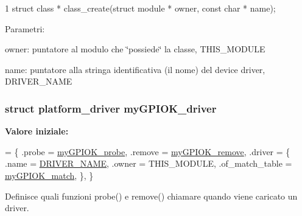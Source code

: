 \begin{DoxyCode}
1 struct class * class\_create(struct module * owner, const char * name);
\end{DoxyCode}
 Parametri\+:
\begin{DoxyItemize}
\item owner\+: puntatore al modulo che \char`\"{}possiede\char`\"{} la classe, T\+H\+I\+S\+\_\+\+M\+O\+D\+U\+L\+E
\item name\+: puntatore alla stringa identificativa (il nome) del device driver, D\+R\+I\+V\+E\+R\+\_\+\+N\+A\+M\+E 
\end{DoxyItemize}\hypertarget{group___linux-_driver_ga8dba1541b58fa63f8208232ffce4fc47}{
\subsubsection[{my\+G\+P\+I\+O\+K\+\_\+driver}]{\setlength{\rightskip}{0pt plus 5cm}struct platform\+\_\+driver my\+G\+P\+I\+O\+K\+\_\+driver\hspace{0.3cm}{\ttfamily [static]}}}\label{group___linux-_driver_ga8dba1541b58fa63f8208232ffce4fc47}
{\bfseries Valore iniziale\+:}
\begin{DoxyCode}
= \{
        .probe = \hyperlink{group___linux-_driver_gae40973a06d72f7c41a9af07513a62307}{myGPIOK\_probe},
        .remove = \hyperlink{group___linux-_driver_ga59fddfaa36dea357f4bbdfceb0f47f8c}{myGPIOK\_remove},
        .driver = \{
                .name = \hyperlink{group___linux-_driver_ga25634d21648ca7fb7a2aca614bafaaeb}{DRIVER\_NAME},
                .owner = THIS\_MODULE,
                .of\_match\_table = \hyperlink{group___linux-_driver_gab59f49dc0fe8d885c73752b8a8163d0e}{myGPIOK\_match},
        \},
\}
\end{DoxyCode}


Definisce quali funzioni probe() e remove() chiamare quando viene caricato un driver. 

